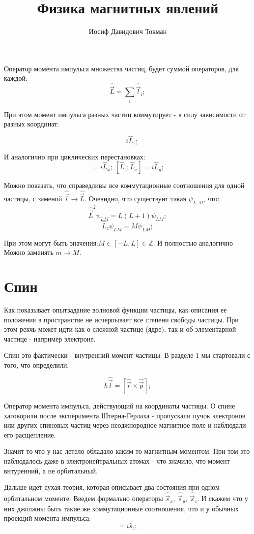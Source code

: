 \documentclass[a4paper, 14pt, russian]{article}
\title{Физика магнитных явлений}
\author{Иосиф Давидович Токман}
\date{}
\newcommand{\be}{\begin{equation}}
\newcommand{\ee}{\end{equation}}
\begin{document}
	\maketitle

	Оператор момента импульса множества частиц, будет суммой операторов, для каждой:
	\be
		\hat{\vec L}  = \sum_i \hat{\vec l}_i;
	\ee

	При этом момент импульса разных частиц коммутирует -  в силу зависимости от разных координат:

	\be
		[\hat{L}_x; \hat{L}_y] = i \hat{L}_z;
	\ee

	И аналогично при циклических перестановках:
	\be
		[\hat{L}_y; \hat{L}_z] = i \hat{L}_x;~[\hat{L}_z; \hat{L}_x] = i \hat{L}_y;
	\ee

	Можно показать, что справедливы все коммутационные соотношения для одной частицы,
	с заменой $\hat{\vec l} \rightarrow \hat{\vec L}$. Очевидно, что существунт
	такая $\psi_{L,M}$, что:
	\be
		\hat{\vec L}^2 \psi_{LM} = L(L+1)\psi_{LM};
	\ee
	\be
		\hat{L}_z \psi_{LM} = M\psi_{LM};
	\ee

	При этом могут быть значения:$M \in [-L, L] \in \mathbb{Z}$. И полностью аналогично Можно
	заменять $m \rightarrow M$.

	\section{Спин}

	Как показывает опытзадание волновой функции частицы,
	как описания ее положения в пространстве не исчерпывает все
	степени свободы частицы. При этом рекчь может идти как о сложной частице (ядре),
	так и об элементарной частице - например электроне.

	Спин это фактически - внутренний момент частицы. В разделе 1 мы стартовали с того, что 
	определили:

	\be
		\hbar \hat{\vec l} = [\hat{\vec r} \times \hat{\vec p}];
	\ee

	Оператор момента импульса, действующий на координаты частицы. О спине хаговорили после эксперимента 
	Штерна-Герлаха - пропускали пучок электронов или других спиновых частиц через неоджнородное магнитное 
	поле и наблюдали его расщепление.

	Значит то что у нас летело обладало каким то магнитным моментом. При том это наблюдалось даже
	в электронейтральных атомах - что значило, что момент внтуренний, а не орбитальный.

	Дальше идет сухая теория, которая описывает два состояния при одном орбитальном моменте. 
	Введем формально операторы $\hat{\vec s}_x,~\hat{\vec s}_y,~\hat{\vec s}_z$. И скажем что у них джолжны быть
	такие же коммутационные соотношения, что и у обычных проекций момента импульса:
	\be
		[\hat{s}_x;\hat{s}_y] = i\hat{s}_z;
	\ee
\end{document}
